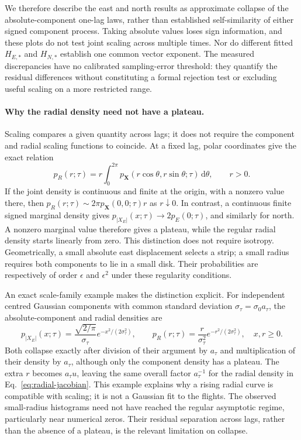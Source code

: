 We therefore describe the east and north results as approximate collapse of
the absolute-component one-lag laws, rather than established self-similarity
of either signed component process. Taking absolute values loses sign
information, and these plots do not test joint scaling across multiple times.
Nor do different fitted $H_{E,*}$ and $H_{N,*}$ establish one common vector
exponent. The measured discrepancies have no calibrated sampling-error
threshold: they quantify the residual differences without constituting a
formal rejection test or excluding useful scaling on a more restricted range.

\paragraph{Why the radial density need not have a plateau.}
Scaling compares a given quantity across lags; it does not require the
component and radial scaling functions to coincide. At a fixed lag, polar
coordinates give the exact relation
\begin{equation}
 p_R(r;\tau)=r\int_0^{2\pi}
 p_{\mathbf X}(r\cos\theta,r\sin\theta;\tau)\,\mathrm d\theta,
 \qquad r>0.
 \label{eq:radial-angular-density}
\end{equation}
If the joint density is continuous and finite at the origin, with a nonzero
value there, then $p_R(r;\tau)\sim2\pi p_{\mathbf X}(0,0;\tau)r$ as
$r\downarrow0$. In contrast, a continuous finite signed marginal density
gives $p_{|X_E|}(x;\tau)\to2p_E(0;\tau)$, and similarly for north.
A nonzero marginal value therefore gives a plateau, while the regular radial
density starts linearly from zero. This distinction does not require isotropy.
Geometrically, a small absolute east displacement selects a strip; a small
radius requires both components to lie in a small disk. Their probabilities
are respectively of order $\epsilon$ and $\epsilon^2$ under these regularity
conditions.

An exact scale-family example makes the distinction explicit. For independent
centred Gaussian components with common standard deviation
$\sigma_\tau=\sigma_0a_\tau$, the absolute-component and radial densities are
\begin{equation}
 p_{|X_E|}(x;\tau)=\frac{\sqrt{2/\pi}}{\sigma_\tau}
       e^{-x^2/(2\sigma_\tau^2)},\qquad
 p_R(r;\tau)=\frac{r}{\sigma_\tau^2}
       e^{-r^2/(2\sigma_\tau^2)},\quad x,r\ge0.
 \label{eq:gaussian-component-radial-scaling}
\end{equation}
Both collapse exactly after division of their argument by $a_\tau$ and
multiplication of their density by $a_\tau$, although only the component
density has a plateau. The extra $r$ becomes $a_\tau u$, leaving the same
overall factor $a_\tau^{-1}$ for the radial density in
Eq.~\eqref{eq:radial-jacobian}. This example explains why a rising radial
curve is compatible with scaling; it is not a Gaussian fit to the flights.
The observed small-radius histograms need not have reached the regular
asymptotic regime, particularly near numerical zeros. Their residual
separation across lags, rather than the absence of a plateau, is the
relevant limitation on collapse.

